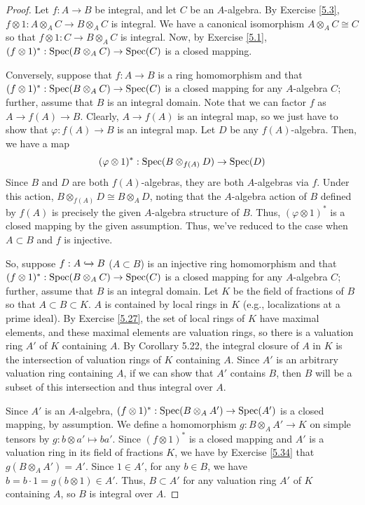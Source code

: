 \begin{proof}
Let $f : A \to B$ be integral, and let $C$ be an $A$-algebra. By Exercise \ref{5.3}, $f \otimes 1 : A \otimes_A C \to B \otimes_A C$ is integral.
We have a canonical isomorphism $A \otimes_A C \cong C$ so that $f \otimes 1 : C \to B \otimes_A C$ is integral. Now, by Exercise \ref{5.1},
$(f \otimes 1)^* : \operatorname{Spec}(B \otimes_A C) \to \operatorname{Spec}(C)$ is a closed mapping.

Conversely, suppose that $f : A \to B$ is a ring homomorphism and that $(f \otimes 1)^* : \operatorname{Spec}(B \otimes_A C) \to \operatorname{Spec}(C)$ is a closed mapping
for any $A$-algebra $C$; further, assume that $B$ is an integral domain. Note that we can factor $f$ as $A \to f(A) \to B$. Clearly,
$A \to f(A)$ is an integral map, so we just have to show that $\varphi : f(A) \to B$ is an integral map. Let $D$ be any $f(A)$-algebra. Then,
we have a map
$$(\varphi \otimes 1)^* : \operatorname{Spec}(B \otimes_{f(A)} D) \to \operatorname{Spec}(D)$$
Since $B$ and $D$ are both $f(A)$-algebras, they are both $A$-algebras via $f$. Under this action, $B \otimes_{f(A)} D \cong B \otimes_A D$, noting
that the $A$-algebra action of $B$ defined by $f(A)$ is precisely the given $A$-algebra structure of $B$. Thus,
$(\varphi \otimes 1)^*$ is a closed mapping by the given assumption. Thus, we've reduced to the case when $A \subset B$ and $f$ is injective.

So, suppose $f : A \xhookrightarrow{} B$ ($A \subset B$) is an injective ring homomorphism and that $(f \otimes 1)^* : \operatorname{Spec}(B \otimes_A C) \to \operatorname{Spec}(C)$ 
is a closed mapping for any $A$-algebra $C$; further, assume that $B$ is an integral domain. Let $K$ be the field of fractions of $B$ so that $A \subset B \subset K$.
$A$ is contained by local rings in $K$ (e.g., localizations at a prime ideal). By Exercise \ref{5.27}, the set of local rings of $K$ have maximal elements, 
and these maximal elements are valuation rings, so there is a valuation ring $A'$ of $K$ containing $A$. By Corollary 5.22, the integral closure of $A$
in $K$ is the intersection of valuation rings of $K$ containing $A$. Since $A'$ is an arbitrary valuation ring containing $A$, if we can show that
$A'$ contains $B$, then $B$ will be a subset of this intersection and thus integral over $A$.

Since $A'$ is an $A$-algebra, $(f \otimes 1)^* : \operatorname{Spec}(B \otimes_A A') \to \operatorname{Spec}(A')$ is a closed mapping, by assumption. We define a homomorphism
$g : B \otimes_A A' \to K$ on simple tensors by $g : b \otimes a' \mapsto b a'$. Since $(f \otimes 1)^*$ is a closed mapping and $A'$ is
a valuation ring in its field of fractions $K$, we have by Exercise \ref{5.34} that $g(B \otimes_A A') = A'$. Since $1 \in A'$, for any $b \in B$,
we have $b = b \cdot 1 = g(b \otimes 1) \in A'$. Thus, $B \subset A'$ for any valuation ring $A'$ of $K$ containing $A$, so $B$ is integral over $A$.


\end{proof}
